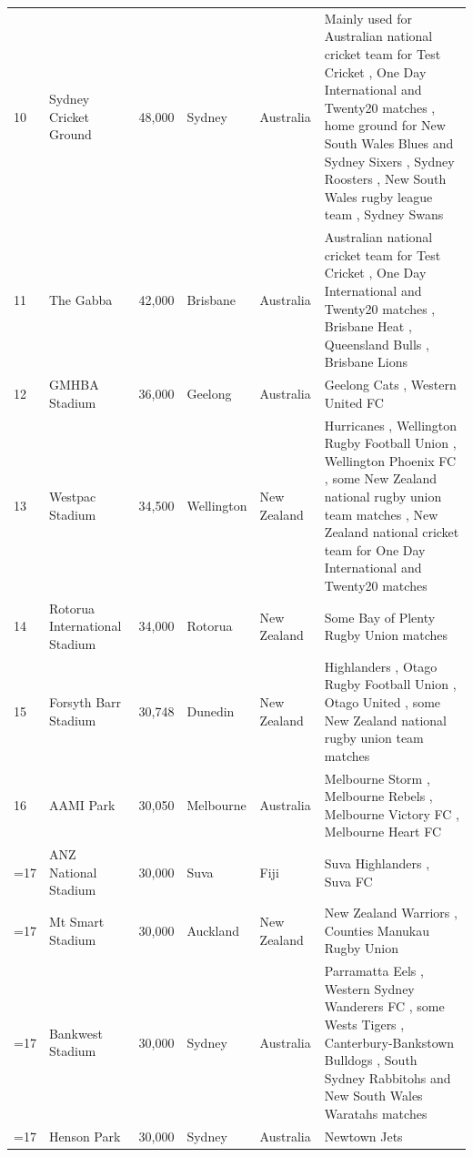 \documentclass{article}
\begin{document}
\begin{tabular}{llllll}
10 & Sydney Cricket Ground & 48,000 & Sydney & Australia & Mainly used for Australian national cricket team for Test Cricket , One Day International and Twenty20 matches , home ground for New South Wales Blues and Sydney Sixers , Sydney Roosters , New South Wales rugby league team , Sydney Swans \\
11 & The Gabba & 42,000 & Brisbane & Australia & Australian national cricket team for Test Cricket , One Day International and Twenty20 matches , Brisbane Heat , Queensland Bulls , Brisbane Lions \\
12 & GMHBA Stadium & 36,000 & Geelong & Australia & Geelong Cats , Western United FC \\
13 & Westpac Stadium & 34,500 & Wellington & New Zealand & Hurricanes , Wellington Rugby Football Union , Wellington Phoenix FC , some New Zealand national rugby union team matches , New Zealand national cricket team for One Day International and Twenty20 matches \\
14 & Rotorua International Stadium & 34,000 & Rotorua & New Zealand & Some Bay of Plenty Rugby Union matches \\
15 & Forsyth Barr Stadium & 30,748 & Dunedin & New Zealand & Highlanders , Otago Rugby Football Union , Otago United , some New Zealand national rugby union team matches \\
16 & AAMI Park & 30,050 & Melbourne & Australia & Melbourne Storm , Melbourne Rebels , Melbourne Victory FC , Melbourne Heart FC \\
=17 & ANZ National Stadium & 30,000 & Suva & Fiji & Suva Highlanders , Suva FC \\
=17 & Mt Smart Stadium & 30,000 & Auckland & New Zealand & New Zealand Warriors , Counties Manukau Rugby Union \\
=17 & Bankwest Stadium & 30,000 & Sydney & Australia & Parramatta Eels , Western Sydney Wanderers FC , some Wests Tigers , Canterbury-Bankstown Bulldogs , South Sydney Rabbitohs and New South Wales Waratahs matches \\
=17 & Henson Park & 30,000 & Sydney & Australia & Newtown Jets \\
\bottomrule
\end{tabular}
\end{document}
